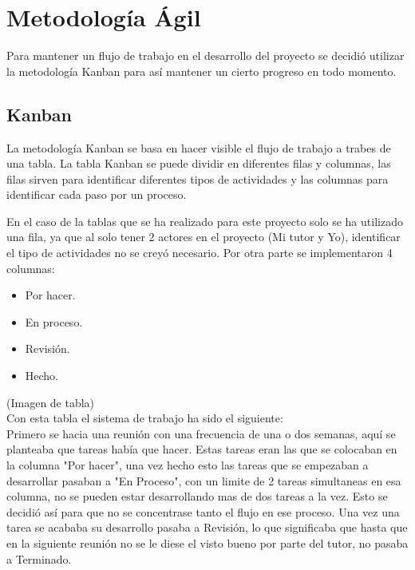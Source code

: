 
\section{Metodología Ágil}

Para mantener un flujo de trabajo en el desarrollo del proyecto se decidió utilizar la metodología Kanban para así mantener un cierto progreso en todo momento.

\subsection{Kanban}

La metodología Kanban se basa en hacer visible el flujo de trabajo a trabes de una tabla.
La tabla Kanban se puede dividir en diferentes filas y columnas, las filas sirven para identificar diferentes tipos de actividades y las columnas para identificar cada paso por un proceso.

En el caso de la tablas que se ha realizado para este proyecto solo se ha utilizado una fila, ya que al solo tener 2 actores en el proyecto (Mi tutor y Yo), identificar el tipo de actividades no se creyó necesario. Por otra parte se implementaron 4 columnas:

\begin{itemize}
	\item Por hacer.
	\item En proceso.
	\item Revisión.
	\item Hecho.
\end{itemize}

(Imagen de tabla)\\

Con esta tabla el sistema de trabajo ha sido el siguiente:\\

Primero se hacia una reunión con una frecuencia de una o dos semanas, aquí se planteaba que tareas había que hacer. Estas tareas eran las que se colocaban en la columna "Por hacer", una vez hecho esto las tareas que  se empezaban a desarrollar pasaban a "En Proceso", con un limite de 2 tareas simultaneas en esa columna, no se pueden estar desarrollando mas de dos tareas a la vez. Esto se decidió así para que no se concentrase tanto el flujo en ese proceso. Una vez una tarea se acababa su desarrollo pasaba a Revisión, lo que significaba que hasta que en la siguiente reunión no se le diese el visto bueno por parte del tutor, no pasaba a Terminado.


